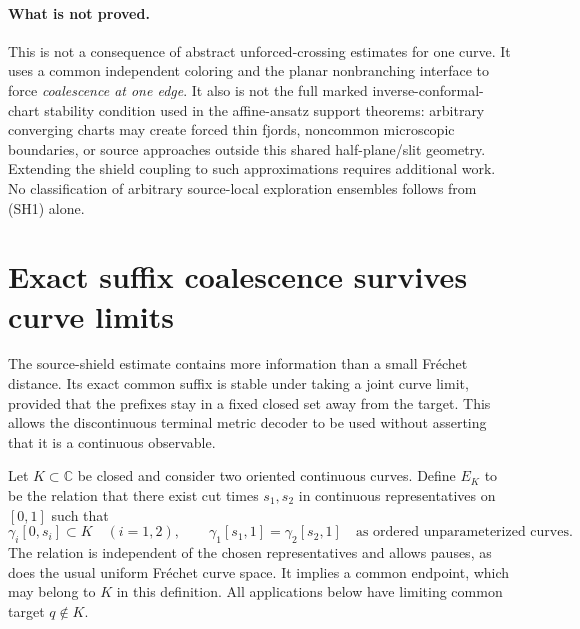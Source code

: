 \documentclass[11pt]{article}
\theoremstyle{definition}\newtheorem{definition}[theorem]{Definition}
\theoremstyle{remark}\newtheorem{remark}[theorem]{Remark}
\begin{document}
\paragraph{What is not proved.}
This is not a consequence of abstract unforced-crossing estimates for one
curve. It uses a common independent coloring and the planar nonbranching
interface to force \emph{coalescence at one edge}. It also is not the full
marked inverse-conformal-chart stability condition used in the affine-ansatz
support theorems: arbitrary converging charts may create forced thin fjords,
noncommon microscopic boundaries, or source approaches outside this shared
half-plane/slit geometry. Extending the shield coupling to such approximations
requires additional work. No classification of arbitrary source-local
exploration ensembles follows from (SH1) alone.


\section{Exact suffix coalescence survives curve limits}
\label{sec:coalescence-bridge}

The source-shield estimate contains more information than a small
Fr\'echet distance. Its exact common suffix is stable under taking a
joint curve limit, provided that the prefixes stay in a fixed closed set
away from the target. This allows the discontinuous terminal metric
decoder to be used without asserting that it is a continuous observable.

Let $K\subset\mathbb C$ be closed and consider two oriented continuous
curves. Define $E_K$ to be the relation
that there exist cut times $s_1,s_2$ in continuous representatives on
$[0,1]$ such that
\[
 \gamma_i[0,s_i]\subset K\quad(i=1,2),\qquad
 \gamma_1[s_1,1]=\gamma_2[s_2,1]
 \quad\text{as ordered unparameterized curves}.
 \tag{CB1}
\]
The relation is independent of the chosen representatives and allows
pauses, as does the usual uniform Fr\'echet curve space. It implies a
common endpoint, which may belong to $K$ in this definition. All
applications below have limiting common target $q\notin K$.
\end{document}
